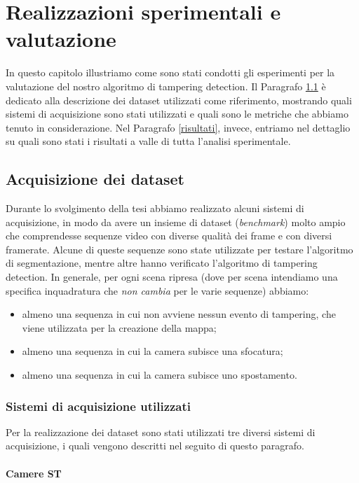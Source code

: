 \chapter{Realizzazioni sperimentali e valutazione}
\label{ProveSperimentali}
\thispagestyle{empty}

\vspace{0.5cm}

\noindent In questo capitolo illustriamo come sono stati condotti gli esperimenti per la valutazione del nostro algoritmo di tampering detection.
Il Paragrafo \ref{acquisizione} \`e dedicato alla descrizione dei dataset utilizzati come riferimento, mostrando quali sistemi di acquisizione sono stati utilizzati e quali sono le metriche che abbiamo tenuto in considerazione.
Nel Paragrafo \ref{risultati}, invece, entriamo nel dettaglio su quali sono stati i risultati a valle di tutta l'analisi sperimentale. 
\section{Acquisizione dei dataset}
\label{acquisizione}
Durante lo svolgimento della tesi abbiamo realizzato alcuni sistemi di acquisizione, in modo da avere un insieme di dataset (\textit{benchmark}) molto ampio che comprendesse sequenze video con diverse qualit\`a dei frame e con diversi framerate.
Alcune di queste sequenze sono state utilizzate per testare l'algoritmo di segmentazione, mentre altre hanno verificato l'algoritmo di tampering detection.
In generale, per ogni scena ripresa (dove per scena intendiamo una specifica inquadratura che \textit{non cambia} per le varie sequenze) abbiamo:
\begin{itemize}
	\item almeno una sequenza in cui non avviene nessun evento di tampering, che viene utilizzata per la creazione della mappa;
	\item almeno una sequenza in cui la camera subisce una sfocatura;
	\item almeno una sequenza in cui la camera subisce uno spostamento.
\end{itemize}
\subsection{Sistemi di acquisizione utilizzati}
Per la realizzazione dei dataset sono stati utilizzati tre diversi sistemi di acquisizione, i quali vengono descritti nel seguito di questo paragrafo.
\subsubsection{Camere ST}

